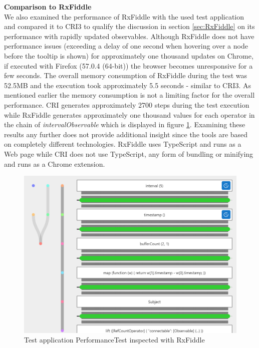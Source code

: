 	\textbf{Comparison to RxFiddle}\\
	We also examined the performance of RxFiddle with the used test application and compared it to CRI3 to qualify the discussion in section \ref{sec:RxFiddle} on its performance with rapidly updated observables.
	Although RxFiddle does not have performance issues (exceeding a delay of one second when hovering over a node before the tooltip is shown) for approximately one thousand updates on Chrome, if executed with Firefox (57.0.4 (64-bit)) the browser becomes unresponsive for a few seconds. The overall memory consumption of RxFiddle during the test was 52.5MB and the execution took approximately 5.5 seconds - similar to CRI3. As mentioned earlier the memory consumption is not a limiting factor for the overall performance. CRI generates approximately 2700 steps during the test execution while RxFiddle generates approximately one thousand values for each operator in the chain of \emph{intervalObservable} which is displayed in figure \ref{fig:RxFiddlePerformance}. Examining these results any further does not provide additional insight since the tools are based on completely different technologies. RxFiddle uses TypeScript and runs as a Web page while CRI does not use TypeScript, any form of bundling or minifying and runs as a Chrome extension.
	
	\begin{figure}[!h]
		\centering
		\includegraphics[scale=0.7,trim=0 0 0 0]{gfx/RxFiddleWithTimer.png}
		\caption{Test application PerformanceTest inspected with RxFiddle}
		\label{fig:RxFiddlePerformance}
	\end{figure}
	
